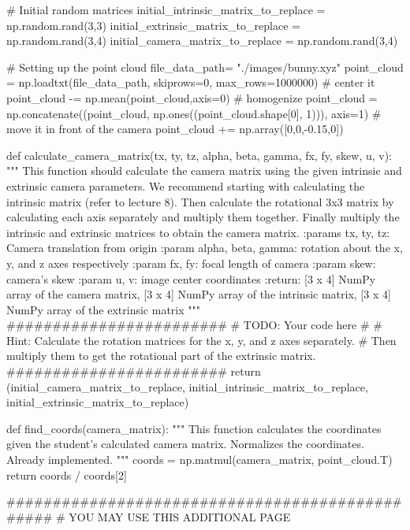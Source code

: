 \begin{enumerate}[(a)]
\begin{tcolorbox}[enhanced jigsaw,breakable,pad at break*=1mm,colback=white!5!white,colframe=green!75!black,height fixed for=all]
\begin{python}
# Initial random matrices
initial_intrinsic_matrix_to_replace = np.random.rand(3,3)
initial_extrinsic_matrix_to_replace = np.random.rand(3,4)
initial_camera_matrix_to_replace = np.random.rand(3,4)

# Setting up the point cloud
file_data_path= "./images/bunny.xyz"
point_cloud = np.loadtxt(file_data_path, skiprows=0, max_rows=1000000)
# center it
point_cloud -= np.mean(point_cloud,axis=0)
# homogenize
point_cloud = np.concatenate((point_cloud, np.ones((point_cloud.shape[0], 1))), axis=1)
# move it in front of the camera
point_cloud += np.array([0,0,-0.15,0])

def calculate_camera_matrix(tx, ty, tz, alpha, beta, gamma, fx, fy, skew, u, v):
    """
    This function should calculate the camera matrix using the given
    intrinsic and extrinsic camera parameters.
    We recommend starting with calculating the intrinsic matrix (refer to lecture 8).
    Then calculate the rotational 3x3 matrix by calculating each axis separately and
    multiply them together.
    Finally multiply the intrinsic and extrinsic matrices to obtain the camera matrix.
    :params tx, ty, tz: Camera translation from origin
    :param alpha, beta, gamma: rotation about the x, y, and z axes respectively
    :param fx, fy: focal length of camera
    :param skew: camera's skew
    :param u, v: image center coordinates
    :return: [3 x 4] NumPy array of the camera matrix, [3 x 4] NumPy array of the intrinsic matrix, [3 x 4] NumPy array of the extrinsic matrix
    """
    ########################
    # TODO: Your code here #
    # Hint: Calculate the rotation matrices for the x, y, and z axes separately.
    # Then multiply them to get the rotational part of the extrinsic matrix.
    ########################
    return (initial_camera_matrix_to_replace, 
    initial_intrinsic_matrix_to_replace, 
    initial_extrinsic_matrix_to_replace)

def find_coords(camera_matrix):
    """
    This function calculates the coordinates given the student's calculated camera matrix.
    Normalizes the coordinates.
    Already implemented.
    """
    coords = np.matmul(camera_matrix, point_cloud.T)
    return coords / coords[2]













    ################################################
    # YOU MAY USE THIS ADDITIONAL PAGE


\end{python}
\end{tcolorbox}
\end{enumerate}
